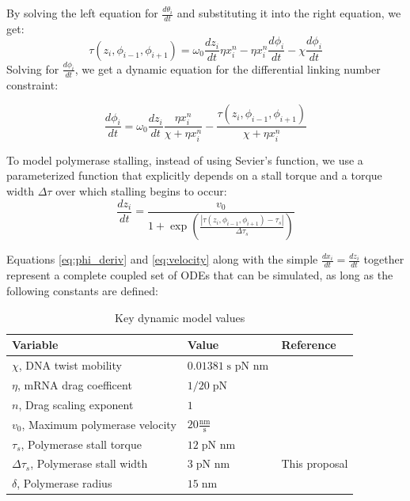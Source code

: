 \documentclass[11pt]{article}
\newcommand{\units}[2]{\frac{\text{#1}}{\text{#2}}\,}
\newcommand{\unit}[1]{\; \text{#1}\,}
\begin{document}
By solving the left equation for \(\frac{d \theta_i}{dt}\) and substituting it into the right equation, we get:
\[\tau(z_i, \phi_{i-1}, \phi_{i+1}) = \omega_0 \frac{dz_i}{dt} \eta x_i^n - \eta x_i^n \frac{d\phi_i}{dt} - \chi \frac{d\phi_i}{dt}\]
Solving for \(\frac{d\phi_i}{dt}\), we get a dynamic equation for the differential linking number constraint:

\begin{equation}
    \frac{d\phi_i}{dt} = \omega_0 \frac{dz_i}{dt} \frac{\eta x_i^n}{\chi + \eta x_i^n} - \frac{\tau(z_i, \phi_{i-1}, \phi_{i+1})}{\chi + \eta x_i^n}
\end{equation} \label{eq:phi_deriv}

To model polymerase stalling, instead of using Sevier's function, we use a parameterized function that explicitly depends on a stall torque and a torque width \(\Delta \tau\) over which stalling begins to occur:
\begin{equation}
    \frac{dz_i}{dt} = \frac{v_0}{1 + \exp\left(\frac{|\tau(z_i, \phi_{i-1}, \phi_{i+1}) - \tau_s|}{\Delta \tau_s}\right)}
\end{equation} \label{eq:velocity}

Equations \ref{eq:phi_deriv} and \ref{eq:velocity} along with the simple \(\frac{dx_i}{dt} = \frac{dz_i}{dt}\) together represent a complete coupled set of ODEs that can be simulated, as long as the following constants are defined:

\begin{table}[h]
    \centering
    \begin{tabular}{@{}lll@{}}
        \toprule
        Variable & Value & Reference \\
        \midrule
        \(\chi\), DNA twist mobility  & \(0.01381 \unit{s pN nm}\) & \parencite{sevierPropertiesGeneExpression2018} \\
        \(\eta\), mRNA drag coefficent  & \(1/20 \unit{pN}\) & \parencite{sevierPropertiesGeneExpression2018} \\
        \(n\), Drag scaling exponent  & \(1\) & \parencite{sevierPropertiesGeneExpression2018} \\
        \(v_0\), Maximum polymerase velocity  & \(20 \units{nm}{s}\) & \parencite{sevierPropertiesGeneExpression2018} \\
        \(\tau_s\), Polymerase stall torque  & \(12 \unit{pN nm}\) & \parencite{sevierPropertiesGeneExpression2018} \\
        \(\Delta \tau_s\), Polymerase stall width  & \(3 \unit{pN nm}\) & This proposal \\
        \(\delta\), Polymerase radius  & \(15 \unit{nm}\) & \parencite{sevierPropertiesGeneExpression2018} \\
        \bottomrule
    \end{tabular}
    \caption{Key dynamic model values}
    \label{tab:dynamic_model_constants}
\end{table}
\end{document}
